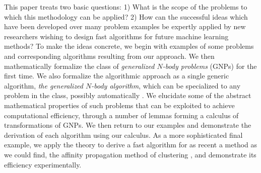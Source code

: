 \documentclass{article}
\begin{document}
This paper treats two basic questions: 1) What
is the scope of the problems to which this methodology can be applied? 2)
How can the successful ideas which have been developed over many problem 
examples be expertly applied by new researchers wishing to
design fast algorithms for future machine learning methods?
To make the ideas concrete, we begin with examples of some problems
and corresponding algorithms resulting from our approach.  We then
mathematically formalize the class of {\em generalized $N$-body
problems} (GNPs) for the first time.  We also formalize the
algorithmic approach as a single generic algorithm, {\em the
generalized $N$-body algorithm}, which can be specialized to any problem in the
class, possibly automatically \cite{autobayes}.
We elucidate some of
the abstract mathematical properties of such problems that can be
exploited to achieve computational efficiency, through a number of
lemmas forming a calculus of transformations of GNPs.  We then return
to our examples and demonstrate the derivation of each algorithm using
our calculus.  As a more sophisticated final example, we apply the
theory to derive a fast algorithm for as recent a method as we could
find, the affinity propagation method of clustering \cite{affinity}, and
demonstrate its efficiency experimentally.



%
%
%
%
\end{document}
